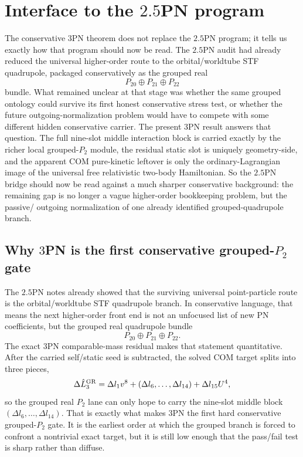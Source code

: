\documentclass[11pt]{article}
\begin{document}

\section{Interface to the \texorpdfstring{$2.5$}{2.5}PN program}
\label{sec:interface-25pn}

The conservative $3$PN theorem does not replace the $2.5$PN program; it tells us
exactly how that program should now be read.  The $2.5$PN audit had already
reduced the universal higher-order route to the orbital/\allowbreak worldtube STF
quadrupole, packaged conservatively as the grouped real
\[
P_{20}\oplus P_{21}\oplus P_{22}
\]
bundle.  What remained unclear at that stage was whether the same grouped
ontology could survive its first honest conservative stress test, or whether the
future outgoing-normalization problem would have to compete with some different
hidden conservative carrier.  The present $3$PN result answers that question.
The full nine-slot middle interaction block is carried exactly by the richer
local grouped-$P_2$ module, the residual static slot is uniquely geometry-side,
and the apparent COM pure-kinetic leftover is only the ordinary-Lagrangian image
of the universal free relativistic two-body Hamiltonian.  So the $2.5$PN bridge
should now be read against a much sharper conservative background: the remaining
gap is no longer a vague higher-order bookkeeping problem, but the passive/
outgoing normalization of one already identified grouped-quadrupole branch.

\subsection{Why \texorpdfstring{$3$}{3}PN is the first conservative grouped-\texorpdfstring{$P_2$}{P 2} gate}
\label{sec:interface-why}

The $2.5$PN notes already showed that the surviving universal point-particle
route is the orbital/\allowbreak worldtube STF quadrupole branch.  In conservative
language, that means the next higher-order front end is not an unfocused list of
new PN coefficients, but the grouped real quadrupole bundle
\[
P_{20}\oplus P_{21}\oplus P_{22}.
\]
The exact $3$PN comparable-mass residual makes that statement quantitative.
After the carried self/static seed is subtracted, the solved COM target splits
into three pieces,
\begin{equation}
\Delta \hat L_3^{\rm GR}
=
\Delta l_1 v^8
+
(\Delta l_6,\ldots,\Delta l_{14})
+
\Delta l_{15}U^4,
\label{eq:interface-com-split-raw}
\end{equation}
so the grouped real $P_2$ lane can only hope to carry the nine-slot middle block
\((\Delta l_6,\ldots,\Delta l_{14})\).  That is exactly what makes $3$PN the
first hard conservative grouped-$P_2$ gate.  It is the earliest order at which
the grouped branch is forced to confront a nontrivial exact target, but it is
still low enough that the pass/fail test is sharp rather than diffuse.
\end{document}
